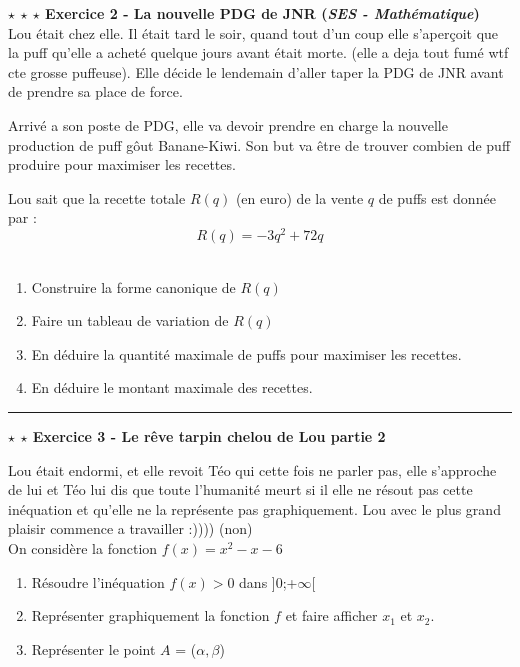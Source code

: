 \documentclass{article}
\begin{document}
	\noindent \textbf{$\star$ $\star$ $\star$ Exercice 2 - La nouvelle PDG de JNR (\textit{SES - Mathématique})}\\
	
	Lou était chez elle. Il était tard le soir, quand tout d'un coup elle s'aperçoit que la puff qu'elle a acheté quelque jours avant était morte. (elle a deja tout fumé wtf cte grosse puffeuse). Elle décide le lendemain d'aller taper la PDG de JNR avant de prendre sa place de force.
	
	Arrivé a son poste de PDG, elle va devoir prendre en charge la nouvelle production de puff gôut Banane-Kiwi. Son but va être de trouver combien de puff produire pour maximiser les recettes.
	
	Lou sait que la recette totale $R(q)$ (en euro) de la vente $q$ de puffs est donnée par : \\
	\[
		R(q) = -3q^2 + 72q
	\] 
	\\
	\begin{enumerate}
		\item Construire la forme canonique de $R(q)$
		\item Faire un tableau de variation de $R(q)$
		\item En déduire la quantité maximale de puffs pour maximiser les recettes.
		\item En déduire le montant maximale des recettes.\\
	\end{enumerate}
	
	\rule{\textwidth}{0.4pt}
	
	\noindent \textbf{$\star$ $\star$ Exercice 3 - Le rêve tarpin chelou de Lou partie 2}
	
	Lou était endormi, et elle revoit Téo qui cette fois ne parler pas, elle s'approche de lui et Téo lui dis que toute l'humanité meurt si il elle ne résout pas cette inéquation et qu'elle ne la représente pas graphiquement. Lou avec le plus grand plaisir commence a travailler :)))) (non)\\
	
	\noindent On considère la fonction $f(x) = x^2 - x - 6$
	\begin{enumerate}
		\item Résoudre l'inéquation $f(x) > 0$ dans ]0;+$\infty$[
		\item Représenter graphiquement la fonction $f$ et faire afficher $x_1$ et $x_2$.
		\item Représenter le point $A$ = ($\alpha, \beta$)\\
	\end{enumerate}
	
\end{document}
